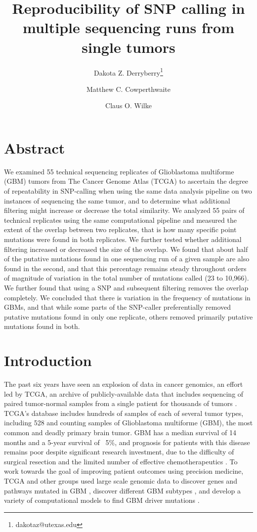 \documentclass[11pt]{article} %
\title{Reproducibility of SNP calling in multiple sequencing runs from single tumors}
\author[1]{Dakota Z. Derryberry\thanks{dakotaz@utexas.edu}}
\author[3]{Matthew C. Cowperthwaite}
\author[1,2]{Claus O. Wilke}
\affil[1]{The University of Texas at Austin, Cell \& Molecular Biology}
\affil[2]{The University of Texas at Austin, Integrative Biology}
\affil[3]{St. David's NeuroTexas Institute Research Foundation}
\begin{document}
\maketitle

\section*{Abstract}

We examined 55 technical sequencing replicates of Glioblastoma multiforme (GBM) tumors from The Cancer Genome Atlas (TCGA) to ascertain the degree of repeatability in SNP-calling when using the same data analysis pipeline on two instances of sequencing the same tumor, and to determine what additional filtering might increase or decrease the total similarity. We analyzed 55 pairs of technical replicates using the same computational pipeline and measured the extent of the overlap between two replicates, that is how many specific point mutations were found in both replicates. We further tested whether additional filtering increased or decreased the size of the overlap.  We found that about half of the putative mutations found in one sequencing run of a given sample are also found in the second, and that this percentage remains steady throughout orders of magnitude of variation in the total number of mutations called (23 to 10,966). We further found that using a SNP and subsequent filtering removes the overlap completely. We concluded that there is variation in the frequency of mutations in GBMs, and that while some parts of the SNP-caller preferentially removed putative mutations found in only one replicate, others removed primarily putative mutations found in both.

\section*{Introduction}

The past six years have seen an explosion of data in cancer genomics, an effort led by TCGA, an archive of publicly-available data that includes sequencing of paired tumor-normal samples from a single patient for thousands of tumors \citep{TCGA-GBM, TCGA-GBM-13}. TCGA's database includes hundreds of samples of each of several tumor types, including 528 and counting samples of Glioblastoma multiforme (GBM), the most common and deadly primary brain tumor. GBM has a median survival of 14 months and a 5-year survival of ~5\%, and prognosis for patients with this disease remains poor despite significant research investment, due to the difficulty of surgical resection and the limited number of effective chemotherapeutics \citep{GBM-stats}. To work towards the goal of improving patient outcomes using precision medicine, TCGA and other groups \citep{Parsons} used large scale genomic data to discover genes and pathways mutated in GBM \citep{pathways}, discover different GBM subtypes \citep{subtypes}, and develop a variety of computational models to find GBM driver mutations \citep{drivers}.
\end{document}

